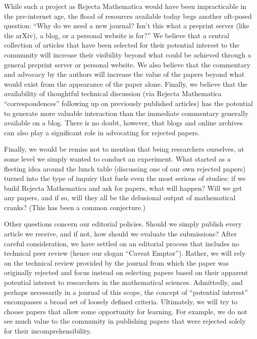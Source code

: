 \documentclass[12pt]{article}
\begin{document}
While such a project as Rejecta Mathematica would have been
impracticable in the pre-internet age, the flood of resources
available today begs another oft-posed question: ``Why do we need a
new journal? Isn't this what a preprint server (like the arXiv), a
blog, or a personal website is for?'' We believe that a central
collection of articles that have been selected for their potential
interest to the community will increase their visibility beyond what
could be achieved through a general preprint server or personal
website. We also believe that the commentary and advocacy by the
authors will increase the value of the papers beyond what would
exist from the appearance of the paper alone. Finally, we believe
that the availability of thoughtful technical discussion (via
Rejecta Mathematica ``correspondences'' following up on previously published articles) has the potential to generate
more valuable interaction than the immediate commentary generally
available on a blog. There is no doubt, however, that blogs and
online archives can also play a significant role in advocating for
rejected papers.

Finally, we would be remiss not to mention that being researchers
ourselves, at some level we simply wanted to conduct an experiment.
What started as a fleeting idea around the lunch table (discussing
one of our own rejected papers) turned into the type of inquiry that
fuels even the most serious of studies: if we build Rejecta
Mathematica and ask for papers, what will happen? Will we get any
papers, and if so, will they all be the delusional output of
mathematical cranks? (This has been a common conjecture.)

Other questions concern our editorial policies. Should we simply
publish every article we receive, and if not, how should we evaluate
the submissions? After careful consideration, we have settled on an
editorial process that includes no technical peer review (hence our
slogan ``Caveat Emptor''). Rather, we will rely on the technical
review provided by the journal from which the paper was originally
rejected and focus instead on selecting papers based on their
apparent potential interest to researchers in the mathematical
sciences. Admittedly, and perhaps necessarily in a journal of this
scope, the concept of ``potential interest'' encompasses a broad set
of loosely defined criteria. Ultimately, we will try to choose
papers that allow some opportunity for learning. For example, we do
not see much value to the community in publishing papers that were
rejected solely for their incomprehensibility.
\end{document}
